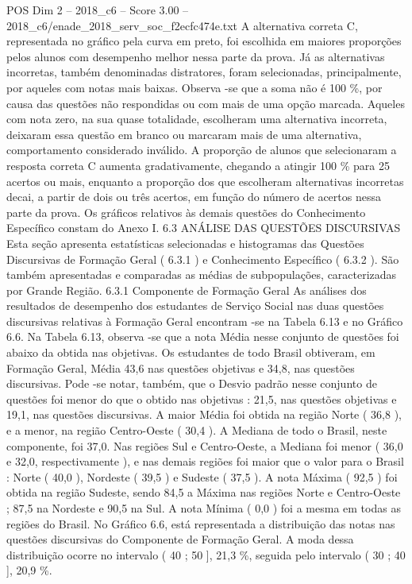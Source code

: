 \begin{textsample}{POS Dim 2 – 2018\_c6 – Score 3.00 – 2018\_c6/enade\_2018\_serv\_soc\_f2ecfc474e.txt}
A alternativa correta C, representada no gráfico pela curva em preto, foi escolhida em maiores proporções pelos alunos com desempenho melhor nessa parte da prova.
Já as alternativas incorretas, também denominadas distratores, foram selecionadas, principalmente, por aqueles com notas mais baixas.
Observa -se que a soma não é 100 \%, por causa das questões não respondidas ou com mais de uma opção marcada.
Aqueles com nota zero, na sua quase totalidade, escolheram uma alternativa incorreta, deixaram essa questão em branco ou marcaram mais de uma alternativa, comportamento considerado inválido.
A proporção de alunos que selecionaram a resposta correta C aumenta gradativamente, chegando a atingir 100 \% para 25 acertos ou mais, enquanto a proporção dos que escolheram alternativas incorretas decai, a partir de dois ou três acertos, em função do número de acertos nessa parte da prova.
Os gráficos relativos às demais questões do Conhecimento Específico constam do Anexo I. 6.3 ANÁLISE DAS QUESTÕES DISCURSIVAS Esta seção apresenta estatísticas selecionadas e histogramas das Questões Discursivas de Formação Geral ( 6.3.1 ) e Conhecimento Específico ( 6.3.2 ).
São também apresentadas e comparadas as médias de subpopulações, caracterizadas por Grande Região. 6.3.1 Componente de Formação Geral As análises dos resultados de desempenho dos estudantes de Serviço Social nas duas questões discursivas relativas à Formação Geral encontram -se na Tabela 6.13 e no Gráfico 6.6.
Na Tabela 6.13, observa -se que a nota Média nesse conjunto de questões foi abaixo da obtida nas objetivas.
Os estudantes de todo Brasil obtiveram, em Formação Geral, Média 43,6 nas questões objetivas e 34,8, nas questões discursivas.
Pode -se notar, também, que o Desvio padrão nesse conjunto de questões foi menor do que o obtido nas objetivas : 21,5, nas questões objetivas e 19,1, nas questões discursivas.
A maior Média foi obtida na região Norte ( 36,8 ), e a menor, na região Centro-Oeste ( 30,4 ).
A Mediana de todo o Brasil, neste componente, foi 37,0.
Nas regiões Sul e Centro-Oeste, a Mediana foi menor ( 36,0 e 32,0, respectivamente ), e nas demais regiões foi maior que o valor para o Brasil : Norte ( 40,0 ), Nordeste ( 39,5 ) e Sudeste ( 37,5 ).
A nota Máxima ( 92,5 ) foi obtida na região Sudeste, sendo 84,5 a Máxima nas regiões Norte e Centro-Oeste ; 87,5 na Nordeste e 90,5 na Sul.
A nota Mínima ( 0,0 ) foi a mesma em todas as regiões do Brasil.
No Gráfico 6.6, está representada a distribuição das notas nas questões discursivas do Componente de Formação Geral.
A moda dessa distribuição ocorre no intervalo ( 40 ; 50 ], 21,3 \%, seguida pelo intervalo ( 30 ; 40 ], 20,9 \%.

\end{textsample}
